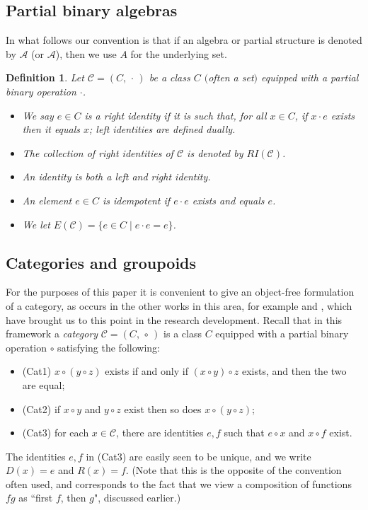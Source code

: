 \documentclass[12pt]{amsart}
\newtheorem{dfn}[thm]{Definition}
\theoremstyle{definition}
\newcommand{\bi}{\begin{itemize}}
\newcommand{\ei}{\end{itemize}}
\newcommand{\C}{\mathcal C}
\begin{document}
\subsection{Partial binary algebras}

In what follows our convention is that if an algebra or partial structure is denoted by $\mathcal{A}$ (or $\mathscr{A}$), then we use $A$ for the underlying set.

\begin{dfn}
Let $\C=(C,\, \cdot\,)$ be a class $C$ $($often a set$)$ equipped with a partial binary operation $\cdot$.  
\bi 
\item We say $e\in C$ is a \emph{right identity} if it is such that, for all $x\in C$, if $x\cdot e$ exists then it equals $x$; left identities are defined dually.
\item The collection of right identities of $\C$ is denoted by $RI(\C)$.
\item An \emph{identity} is both a left and right identity. 
\item  An element $e\in C$ is {\em idempotent} if $e\cdot e$ exists and equals $e$.
\item We let $E(\C)=\{e\in C\mid e\cdot e=e\}$. 
\ei 
\end{dfn}  


\subsection{Categories and groupoids}

For the purposes of this paper it is convenient to give  an object-free formulation of a category, as occurs in the 
other works in this area, for example \cite{constgen} and \cite{lawson1},  which have brought us to this point in the research development. Recall that in this framework a \emph{category} $\C=(C,\, \circ\,)$ is a class $C$ equipped with a partial binary operation $\circ$ satisfying the following:
\bi
\item[] (Cat1) $x\circ(y\circ z)$ exists if and only if $(x\circ y)\circ z$ exists, and then the two are equal;
\item[] (Cat2) if $x\circ y$ and $y\circ z$ exist then so does $x\circ(y\circ z)$;
\item[] (Cat3) for each $x\in \C$, there are identities $e,f$ such that $e\circ x$ and $x\circ f$ exist.
\ei

The identities $e,f$ in (Cat3) are easily seen to be unique,  
and  we write $D(x)=e$ and $R(x)=f$.  (Note that this is the opposite of the convention often used, and corresponds to the fact that we view a composition of functions $fg$ as ``first $f$, then $g$", discussed earlier.)
\end{document}
